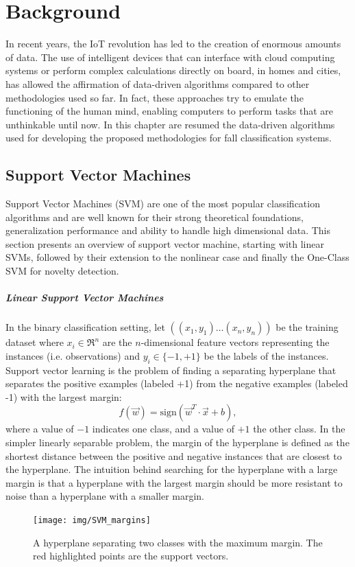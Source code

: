 \chapter{Background}
\label{ch:backg}
In recent years, the IoT revolution has led to the creation of enormous amounts of data. The use of intelligent devices that can interface with cloud computing systems or perform complex calculations directly on board, in homes and cities, has allowed the affirmation of data-driven algorithms compared to other methodologies used so far. In fact, these approaches try to emulate the functioning of the human mind, enabling computers to perform tasks that are unthinkable until now. 
In this chapter are resumed the data-driven algorithms used for developing the proposed methodologies for fall classification systems.

\section{Support Vector Machines}
Support Vector Machines (SVM) \cite{cortes95} are one of the most popular classification algorithms and are well known for their strong theoretical foundations, generalization performance and ability to handle high dimensional data.
This section presents an overview of support vector machine, starting with linear
SVMs, followed by their extension to the nonlinear case and finally the One-Class SVM for novelty detection.

\paragraph{Linear Support Vector Machines}
In the binary classification setting, let $((x_1, y_1)\dots(x_n, y_n))$ be the training dataset where $x_i \in \Re^n$ are the $n$-dimensional feature vectors representing the instances (i.e. observations) and  $y_i \in \{-1, +1\}$ be the labels of the instances. Support vector learning is the problem of finding a separating hyperplane that separates the positive examples (labeled +1) from the negative examples (labeled -1) with the largest margin:
\begin{equation}
f(\vec{w}) =  \mbox{sign} (\vec{w}^T \cdot \vec{x} + b),
\end{equation} 
where a value of $-1$ indicates one class, and a value of $+1$ the other class.
In the simpler linearly separable problem, the margin of the hyperplane is defined as the shortest distance between the positive and negative instances that are closest to the hyperplane. The intuition behind searching for the hyperplane with a large margin is that a hyperplane with the largest margin should be more resistant to noise than a hyperplane with a smaller margin.
\begin{figure}
	\centering
	\texttt{[image: img/SVM\_margins]}
	\caption{A hyperplane separating two classes with the maximum margin. The red highlighted points are the support vectors.
	}
	\label{fig:SVM_margins}
\end{figure} 

